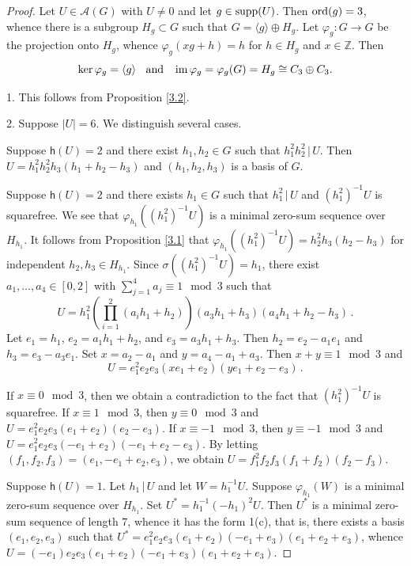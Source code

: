 \documentclass[a4paper, 10pt]{amsart}
\theoremstyle{plain}
\theoremstyle{definition}
\theoremstyle{definition}
\newcommand{\Z}{\mathbb Z}
\newcommand{\und}{\;\mbox{ and }\;}
\newcommand{\la}{\langle}
\newcommand{\ra}{\rangle}
\numberwithin{equation}{section}
\renewcommand{\t}{\, | \,}
\begin{document}
\begin{proof}
Let $U\in \mathcal A(G)$ with $U\neq 0$ and let $g \in \operatorname{supp} (U)$. Then $\operatorname{ord} (g)=3$, whence there is a subgroup $H_g \subset G$ such that $G = \langle g \rangle \oplus H_g$. Let $\varphi_g:G\rightarrow G$ be the projection  onto $H_g$, whence $\varphi_g(xg+h)=h$ for $h\in H_g$ and $x\in \Z$. Then   $$\ker \varphi_g=\la g\ra\;\und\; \im \varphi_g=\varphi_g(G)=H_g\cong C_3\oplus C_3.$$


1. This follows from Proposition \ref{3.2}.
	
2. Suppose $|U|=6$. We distinguish several cases.
	
	Suppose $\mathsf h(U)=2$ and there exist $h_1,h_2\in G$ such that $h_1^2h_2^2\t U$. Then $U=h_1^2h_2^2h_3(h_1+h_2-h_3)$ and $(h_1,h_2,h_3)$ is a basis of $G$.
	
	
	Suppose  $\mathsf h(U)=2$ and there exists $h_1\in G$ such that $h_1^2\t U$ and $(h_1^2)^{-1}U$ is squarefree.
	 We see that $\varphi_{h_1}((h_1^2)^{-1}U)$ is a minimal zero-sum sequence over $H_{h_1}$. It follows from Proposition \ref{3.1}  that $\varphi_{h_1}((h_1^2)^{-1}U)= h_2^2h_3(h_2-h_3)$ for independent $h_2,h_3\in H_{h_1}$.
	Since $\sigma((h_1^2)^{-1}U)=h_1$, there exist $a_1,\ldots,a_4\in [0,2]$ with $\sum_{j=1}^4a_j\equiv 1\mod 3$ such that
	\[
	U=h_1^2\left(\prod_{i=1}^2(a_ih_1+h_2)\right)(a_3h_1 + h_3) (a_4h_1+h_2-h_3) \,.
	\]
	Let $e_1=h_1$, $e_2=a_1h_1+h_2$, and $e_3=a_3h_1+h_3$. Then $h_2=e_2-a_1e_1$ and $h_3=e_3-a_3e_1$. Set $x=a_2-a_1$ and $y=a_4-a_1+a_3$. Then $x+y\equiv 1\mod 3$ and
	\[
	U=e_1^2 e_2 e_3 (xe_1+e_2)(ye_1+e_2-e_3) \,.
	\]
	
	If $x\equiv 0 \mod 3$, then we obtain a contradiction to the fact that $(h_1^2)^{-1}U$	is squarefree.
	If $x\equiv 1 \mod 3$, then $y\equiv 0 \mod 3$ and $U=e_1^2 e_2 e_3 (e_1+e_2)(e_2-e_3)$.
		If $x\equiv -1\mod 3$, then $y\equiv -1 \mod 3$ and $U=e_1^2 e_2 e_3 (-e_1+e_2)(-e_1+e_2-e_3)$.
	By letting $(f_1,f_2,f_3)=(e_1, -e_1+e_2, e_3)$, we obtain $U=f_1^2 f_2 f_3 (f_1+f_2)  (f_2-f_3)$.


	Suppose $\mathsf h(U)=1$. Let $h_1\t U$ and let $W=h_1^{-1}U$.
	Suppose $\varphi_{h_1}(W)$ is a minimal zero-sum sequence over $H_{h_1}$.
	Set $U^*=h_1^{-1}(-h_1)^2U$. Then $U^*$ is a minimal zero-sum sequence of length $7$, whence it has the form 1(c), that is,  there exists a basis $(e_1,e_2,e_3)$ such that $U^*=e_1^2e_2e_3(e_1+e_2)(-e_1+e_3)(e_1+e_2+e_3)$, whence
	$U=(-e_1)e_2e_3(e_1+e_2)(-e_1+e_3)(e_1+e_2+e_3)$.



\end{proof}
\end{document}
